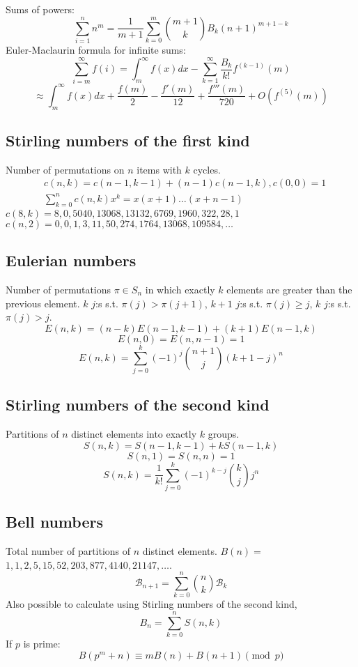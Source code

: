 	Sums of powers:
	\small
	\[ \sum_{i=1}^n n^m = \frac{1}{m+1} \sum_{k=0}^m \binom{m+1}{k} B_k (n+1)^{m+1-k} \]
	\normalsize
	Euler-Maclaurin formula for infinite sums:
	\small
	\[ \sum_{i=m}^{\infty} f(i) = \int_m^\infty f(x) dx - \sum_{k=1}^\infty \frac{B_k}{k!}f^{(k-1)}(m) \]
	\[ \approx \int_{m}^\infty f(x)dx + \frac{f(m)}{2} - \frac{f'(m)}{12} + \frac{f'''(m)}{720} + O(f^{(5)}(m)) \]
	\normalsize

\subsection{Stirling numbers of the first kind}
	Number of permutations on $n$ items with $k$ cycles.
	\begin{align*}
		&c(n,k) = c(n-1,k-1) + (n-1) c(n-1,k), c(0,0) = 1\\
		&\textstyle \sum_{k=0}^n c(n,k)x^k = x(x+1) \dots (x+n-1)
	\end{align*}
	$c(8,k) = 8, 0, 5040, 13068, 13132, 6769, 1960, 322, 28, 1$ 
	$c(n,2) = 0, 0, 1, 3, 11, 50, 274, 1764, 13068, 109584, \dots$

\subsection{Eulerian numbers}
	Number of permutations $\pi \in S_n$ in which exactly $k$ elements are greater than the previous element. $k$ $j$:s s.t. $\pi(j)>\pi(j+1)$, $k+1$ $j$:s s.t. $\pi(j)\geq j$, $k$ $j$:s s.t. $\pi(j)>j$.
	$$E(n,k) = (n-k)E(n-1,k-1) + (k+1)E(n-1,k)$$
	$$E(n,0) = E(n,n-1) = 1$$
	$$E(n,k) = \sum_{j=0}^k(-1)^j\binom{n+1}{j}(k+1-j)^n$$

\subsection{Stirling numbers of the second kind}
	Partitions of $n$ distinct elements into exactly $k$ groups.
	$$S(n,k) = S(n-1,k-1) + k S(n-1,k)$$
	$$S(n,1) = S(n,n) = 1$$
	$$S(n,k) = \frac{1}{k!}\sum_{j=0}^k (-1)^{k-j}\binom{k}{j}j^n$$

\subsection{Bell numbers}
	Total number of partitions of $n$ distinct elements. $B(n) =$
	$1, 1, 2, 5, 15, 52, 203, 877, 4140, 21147, \dots$. 
	\begin{equation*}
    \mathcal{B}_{n+1} = \sum_{k=0}^n \binom{n}{k} \mathcal{B}_k
  \end{equation*}
  Also possible to calculate using Stirling numbers of the second kind,
  \[B_n = \sum_{k = 0}^{n} S(n, k)\]
  If $p$ is prime:
	\[ B(p^m+n)\equiv mB(n)+B(n+1) \pmod{p} \]

